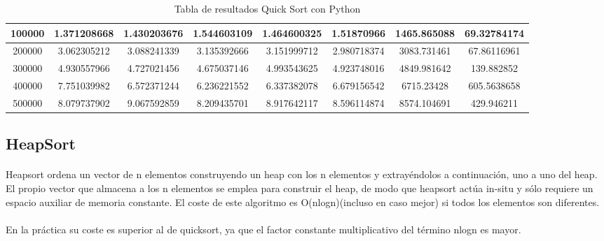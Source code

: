 \documentclass{article}
\begin{document}
\begin{table}[]
\begin{tabular}{|c|c|c|c|c|c|c|c| }
100000	&1.371208668	&1.430203676	&1.544603109	&1.464600325	&1.51870966	&1465.865088	&69.32784174\\ \hline
200000	&3.062305212	&3.088241339	&3.135392666	&3.151999712	&2.980718374	&3083.731461	&67.86116961\\ \hline
300000	&4.930557966	&4.727021456	&4.675037146	&4.993543625	&4.923748016	&4849.981642	&139.882852\\ \hline
400000	&7.751039982	&6.572371244	&6.236221552	&6.337382078	&6.679156542	&6715.23428	&605.5638658\\ \hline
500000	&8.079737902	&9.067592859	&8.209435701	&8.917642117	&8.596114874	&8574.104691	&429.946211\\ \hline

             \end{tabular}
                        \caption{Tabla de resultados Quick Sort con Python}
        \label{tab:quickSortPython}
    \end{table}

    \subsection{HeapSort}
        \paragraph {}
        Heapsort ordena un vector de n elementos construyendo un heap con los n elementos y extrayéndolos a continuación, uno a uno del heap. El propio vector que almacena a los n elementos se emplea para construir el heap, de modo que heapsort actúa in-situ y sólo requiere un espacio auxiliar de memoria constante. El coste de este algoritmo es O(nlogn)(incluso en caso mejor) si todos los elementos son diferentes.
        \paragraph {}
        En la práctica su coste es superior al de quicksort, ya que el factor constante multiplicativo del término nlogn es mayor.
\end{document}
